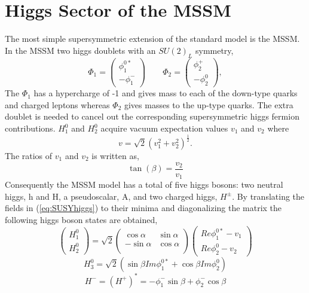 \section{Higgs Sector of the MSSM}
The most simple supersymmetric extension of the standard model is the MSSM.
In the MSSM two higgs doublets with an $SU(2)_{L}$ symmetry,
\begin{equation}
\Phi_{1}=
\left(
    \begin{array}{c}
      \phi_{1}^{0*} \\
      -\phi_{1}^{-}
    \end{array}
  \right) 
 \qquad
\Phi_{2}=
\left(
    \begin{array}{c}
      \phi_{2}^{+} \\
      -\phi_{2}^{0}
    \end{array}
  \right), 
  \label{eq:SUSYhiggs}
\end{equation}
The $\Phi_{1}$ has a hypercharge of -1 and gives mass to each of the
down-type quarks and charged leptons whereas $\Phi_{2}$ gives masses
to the up-type quarks. The extra doublet
is needed to cancel out the corresponding supersymmetric higgs fermion
contributions.
$H_{1}^{0}$ and $H_{2}^{0}$ acquire vacuum expectation values $v_{1}$ and $v_{2}$ where
\begin{equation}
v = \sqrt{2}(v_{1}^{2}+v_{2}^{2})^{\frac{1}{2}}.
\end{equation}
The ratios of $v_{1}$ and $v_{2}$ is written as,
\begin{equation}
\tan(\beta)=\frac{v_{2}}{v_{1}}
\end{equation}
Consequently the MSSM model has a total of five higgs bosons: two neutral higgs, h and H,
a pseudoscalar, A, and two charged higgs, $H^{\pm}$.
By translating the fields in (\ref{eq:SUSYhiggs}) to their minima and diagonalizing the matrix
the following higgs boson states are obtained,
\begin{equation}
\left(
    \begin{array}{c}
      H^{0}_{1} \\
     H^{0}_{2}
    \end{array}
  \right) 
  =
  \sqrt{2}
  \begin{pmatrix}
  \cos{\alpha} & \sin{\alpha}\\
  -\sin{\alpha}& \cos{\alpha}\\
  \end{pmatrix}
\left(
      \begin{array}{c}
      Re{\phi}_{1}^{0*}-v_{1} \\
     Re{\phi}_{2}^{0}-v_{2}
    \end{array}
  \right) 
\end{equation}
\begin{equation}
H_{3}^{0}=\sqrt{2}(\sin{\beta}Im\phi_{1}^{0*}+\cos{\beta}Im\phi^{0}_{2})
\end{equation}
\begin{equation}
H^{-}=(H^{+})^{*}=-\phi_{1}^{-}\sin{\beta}+\phi_{2}^{-}\cos{\beta}
\end{equation}

